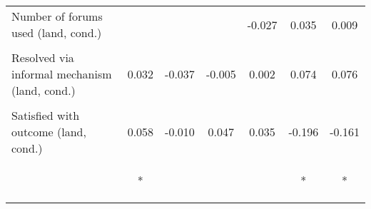 \begin{tabular}{lcccccc}
\noalign{\smallskip}Number of forums used (land, cond.) &  &  &  & -0.027 & 0.035 & 0.009\\
 & \begin{footnotesize}\end{footnotesize} & \begin{footnotesize}\end{footnotesize} & \begin{footnotesize}\end{footnotesize} & \begin{footnotesize}[0.109]\end{footnotesize} & \begin{footnotesize}[0.178]\end{footnotesize} & \begin{footnotesize}[0.153]\end{footnotesize}\\
\noalign{\smallskip}Resolved via informal mechanism (land, cond.) & 0.032 & -0.037 & -0.005 & 0.002 & 0.074 & 0.076\\
 & \begin{footnotesize}[0.024]\end{footnotesize} & \begin{footnotesize}[0.055]\end{footnotesize} & \begin{footnotesize}[0.054]\end{footnotesize} & \begin{footnotesize}[0.051]\end{footnotesize} & \begin{footnotesize}[0.138]\end{footnotesize} & \begin{footnotesize}[0.134]\end{footnotesize}\\
\noalign{\smallskip}Satisfied with outcome (land, cond.) & 0.058 & -0.010 & 0.047 & 0.035 & -0.196 & -0.161\\
 & \begin{footnotesize}[0.033]*\end{footnotesize} & \begin{footnotesize}[0.063]\end{footnotesize} & \begin{footnotesize}[0.060]\end{footnotesize} & \begin{footnotesize}[0.049]\end{footnotesize} & \begin{footnotesize}[0.099]*\end{footnotesize} & \begin{footnotesize}[0.091]*\end{footnotesize}\\

\end{tabular}

